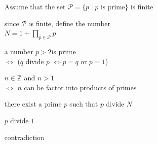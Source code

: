 \label{Asume the contradiction}

​Assume that the set $\mathcal P = \{p \mid p \text{ is prime} \}$ is finite
\label{N definition}

​since $\mathcal P$ is finite, define the number \\$N = 1 + \prod_{p \in \mathcal P}p$​
\label{prime number definition}

a number $p > 2$​ is prime \\$\iff$ ($q$ divide $p$
$\iff p = q$ or $p = 1$)​
\label{fundalmental theorem of arithmetic}

$n \in \mathbb{Z}$ and $n > 1$\\$\iff$ $n$ can be factor into products of primes​​
\label{#6}

there exist a prime $p$ such​ that $p$ divide $N$
\label{#9}

$p$ divide $1$​
\label{#10}

contradiction​
